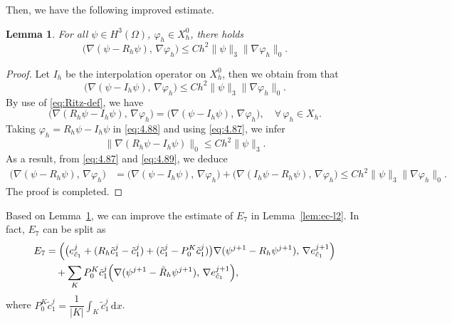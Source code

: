 \documentclass[a4paper,fleqn]{cas-sc}
\numberwithin{equation}{section}
\newtheorem{lemma}[theorem]{Lemma}
\theoremstyle{definition}
\begin{document}
Then, we have the following improved estimate.

\begin{lemma}\label{lem:improved-l2}
For all $\psi\in H^{3}(\Omega)$, $\varphi_{h}\in X_{h}^{0}$, there holds
\begin{equation}\label{eq:4.86}
  \bigl(\nabla(\psi - R_{h}\psi),\, \nabla\varphi_{h}\bigr)
  \leq Ch^{2}\|\psi\|_{3}\|\nabla\varphi_{h}\|_{0}.
\end{equation}
\end{lemma}

\begin{proof}
Let $I_{h}$ be the interpolation operator on $X_{h}^{0}$, then we obtain from
\cite{Lin2006} that
\begin{equation}\label{eq:4.87}
  \bigl(\nabla(\psi - I_{h}\psi),\, \nabla\varphi_{h}\bigr)
  \leq Ch^{2}\|\psi\|_{3}\|\nabla\varphi_{h}\|_{0}.
\end{equation}
By use of \eqref{eq:Ritz-def}, we have
\begin{equation}\label{eq:4.88}
  \bigl(\nabla(R_{h}\psi - I_{h}\psi),\, \nabla\varphi_{h}\bigr)
  = \bigl(\nabla(\psi - I_{h}\psi),\, \nabla\varphi_{h}\bigr),
  \quad \forall\,\varphi_{h}\in X_{h}.
\end{equation}
Taking $\varphi_{h} = R_{h}\psi - I_{h}\psi$ in \eqref{eq:4.88} and using
\eqref{eq:4.87}, we infer
\begin{equation}\label{eq:4.89}
  \bigl\|\nabla(R_{h}\psi - I_{h}\psi)\bigr\|_{0} \leq Ch^{2}\|\psi\|_{3}.
\end{equation}
As a result, from \eqref{eq:4.87} and \eqref{eq:4.89}, we deduce
\begin{align}
  \bigl(\nabla(\psi - R_{h}\psi),\, \nabla\varphi_{h}\bigr)
  &= \bigl(\nabla(\psi - I_{h}\psi),\, \nabla\varphi_{h}\bigr)
   + \bigl(\nabla(I_{h}\psi - R_{h}\psi),\, \nabla\varphi_{h}\bigr)
  \leq Ch^{2}\|\psi\|_{3}\|\nabla\varphi_{h}\|_{0}.
  \label{eq:4.90}
\end{align}
The proof is completed.
\end{proof}

Based on Lemma~\ref{lem:improved-l2}, we can improve the estimate of $E_{7}$ in
Lemma~\ref{lem:ec-l2}. In fact, $E_{7}$ can be split as
\begin{align}
  E_{7}
  &= \Bigl(\bigl(e_{\tilde{c}_{1}}^{j}
                + (R_{h}\tilde{c}_{1}^{j} - \tilde{c}_{1}^{j})
                + (\tilde{c}_{1}^{j} - P_{0}^{K}\tilde{c}_{1}^{j})\bigr)
           \nabla(\psi^{j+1} - R_{h}\psi^{j+1}),\,
           \nabla e_{\tilde{c}_{1}}^{j+1}\Bigr)
  \nonumber\\
  &\quad + \sum_{K} P_{0}^{K}\tilde{c}_{1}^{j}
    \Bigl(\nabla(\psi^{j+1} - \tilde{R}_{h}\psi^{j+1}),\,
          \nabla e_{\tilde{c}_{1}}^{j+1}\Bigr),
  \label{eq:4.91}
\end{align}
where $P_{0}^{K}\tilde{c}_{1}^{j} = \dfrac{1}{|K|}\displaystyle\int_{K}\tilde{c}_{1}^{j}\,\mathrm{d}x$.
\end{document}
